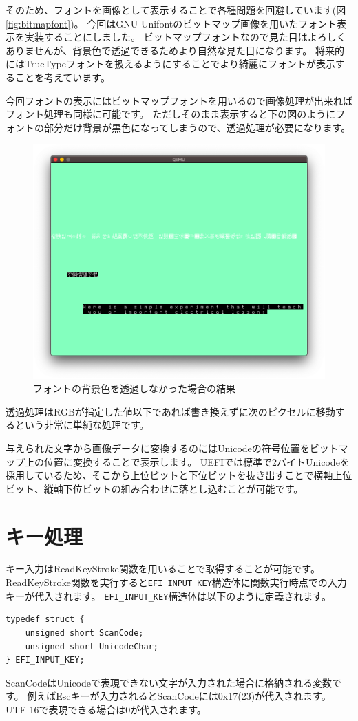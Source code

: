 \documentclass[10pt,b5paper,twoside,openany]{ltjsbook}
\begin{document}
そのため、フォントを画像として表示することで各種問題を回避しています(図\ref{fig:bitmapfont})。
今回はGNU Unifontのビットマップ画像を用いたフォント表示を実装することにしました。
ビットマップフォントなので見た目はよろしくありませんが、背景色で透過できるためより自然な見た目になります。
将来的にはTrueTypeフォントを扱えるようにすることでより綺麗にフォントが表示することを考えています。

今回フォントの表示にはビットマップフォントを用いるので画像処理が出来ればフォント処理も同様に可能です。
ただしそのまま表示すると下の図のようにフォントの部分だけ背景が黒色になってしまうので、透過処理が必要になります。
\begin{figure}[H]
    \centering
    \includegraphics[scale=0.25]{pic/font_with_backblack.png}
    \caption{フォントの背景色を透過しなかった場合の結果}
    \label{fig:font_with_backblack}
\end{figure}
透過処理はRGBが指定した値以下であれば書き換えずに次のピクセルに移動するという非常に単純な処理です。

与えられた文字から画像データに変換するのにはUnicodeの符号位置をビットマップ上の位置に変換することで表示します。
UEFIでは標準で2バイトUnicodeを採用しているため、そこから上位ビットと下位ビットを抜き出すことで横軸上位ビット、縦軸下位ビットの組み合わせに落とし込むことが可能です。

\section{キー処理}
キー入力はReadKeyStroke関数を用いることで取得することが可能です。
ReadKeyStroke関数を実行すると\verb+EFI_INPUT_KEY+構造体に関数実行時点での入力キーが代入されます。
\verb+EFI_INPUT_KEY+構造体は以下のように定義されます。
\begin{lstlisting}[caption=EFI\_INPUT\_KEY,label=efi_input_key]
typedef struct {
    unsigned short ScanCode;
    unsigned short UnicodeChar;
} EFI_INPUT_KEY;
\end{lstlisting}
ScanCodeはUnicodeで表現できない文字が入力された場合に格納される変数です。
例えばEscキーが入力されるとScanCodeには0x17(23)が代入されます。
UTF-16で表現できる場合は0が代入されます。
\end{document}
